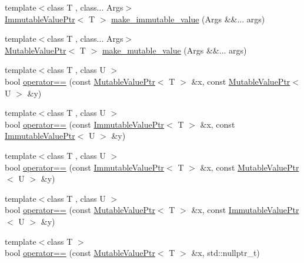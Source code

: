\begin{DoxyCompactItemize}
\item 
{\footnotesize template$<$class T , class... Args$>$ }\\\hyperlink{classreactor_1_1ImmutableValuePtr}{Immutable\+Value\+Ptr}$<$ T $>$ \hyperlink{namespacereactor_a8757688a143832a418a763d3621b1c4d}{make\+\_\+immutable\+\_\+value} (Args \&\&... args)
\item 
{\footnotesize template$<$class T , class... Args$>$ }\\\hyperlink{classreactor_1_1MutableValuePtr}{Mutable\+Value\+Ptr}$<$ T $>$ \hyperlink{namespacereactor_ae4fe60384411a317f354245149b85dbc}{make\+\_\+mutable\+\_\+value} (Args \&\&... args)
\item 
{\footnotesize template$<$class T , class U $>$ }\\bool \hyperlink{namespacereactor_ab9c3123244fedcd98c92e38874bee37d}{operator==} (const \hyperlink{classreactor_1_1MutableValuePtr}{Mutable\+Value\+Ptr}$<$ T $>$ \&x, const \hyperlink{classreactor_1_1MutableValuePtr}{Mutable\+Value\+Ptr}$<$ U $>$ \&y)
\item 
{\footnotesize template$<$class T , class U $>$ }\\bool \hyperlink{namespacereactor_a2fdf4cb9154560eba99721c91aa766cc}{operator==} (const \hyperlink{classreactor_1_1ImmutableValuePtr}{Immutable\+Value\+Ptr}$<$ T $>$ \&x, const \hyperlink{classreactor_1_1ImmutableValuePtr}{Immutable\+Value\+Ptr}$<$ U $>$ \&y)
\item 
{\footnotesize template$<$class T , class U $>$ }\\bool \hyperlink{namespacereactor_ab088f033423a22b03f5f6f76ecb04b1b}{operator==} (const \hyperlink{classreactor_1_1ImmutableValuePtr}{Immutable\+Value\+Ptr}$<$ T $>$ \&x, const \hyperlink{classreactor_1_1MutableValuePtr}{Mutable\+Value\+Ptr}$<$ U $>$ \&y)
\item 
{\footnotesize template$<$class T , class U $>$ }\\bool \hyperlink{namespacereactor_a9079eb51590f5e096fc3d8cfb073540f}{operator==} (const \hyperlink{classreactor_1_1MutableValuePtr}{Mutable\+Value\+Ptr}$<$ T $>$ \&x, const \hyperlink{classreactor_1_1ImmutableValuePtr}{Immutable\+Value\+Ptr}$<$ U $>$ \&y)
\item 
{\footnotesize template$<$class T $>$ }\\bool \hyperlink{namespacereactor_a2155cd0a1349ccb36b00bb369443a084}{operator==} (const \hyperlink{classreactor_1_1MutableValuePtr}{Mutable\+Value\+Ptr}$<$ T $>$ \&x, std\+::nullptr\+\_\+t)
\item 

\end{DoxyCompactItemize}

